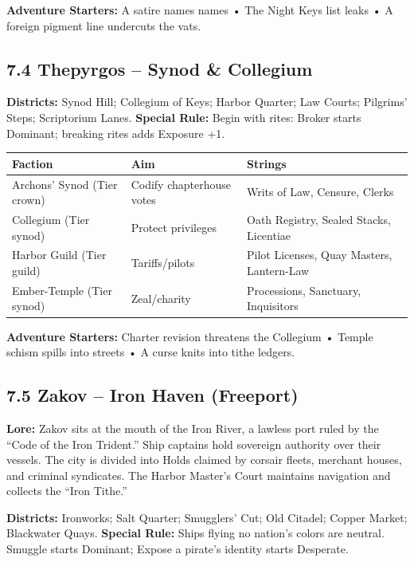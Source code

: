 \documentclass[11pt]{article}
\begin{document}
\textbf{Adventure Starters:} A satire names names • The Night Keys list leaks • A foreign pigment line undercuts the vats.

\subsection*{7.4 Thepyrgos -- Synod \& Collegium}
\textbf{Districts:} Synod Hill; Collegium of Keys; Harbor Quarter; Law Courts; Pilgrims' Steps; Scriptorium Lanes.  
\textbf{Special Rule:} Begin with rites: Broker starts Dominant; breaking rites adds Exposure +1.

\begin{tabular}{@{}p{3cm}p{3.5cm}p{3.5cm}@{}}
\toprule
Faction & Aim & Strings \\
\midrule
Archons' Synod (Tier crown) & Codify chapterhouse votes & Writs of Law, Censure, Clerks \\
Collegium (Tier synod) & Protect privileges & Oath Registry, Sealed Stacks, Licentiae \\
Harbor Guild (Tier guild) & Tariffs/pilots & Pilot Licenses, Quay Masters, Lantern-Law \\
Ember-Temple (Tier synod) & Zeal/charity & Processions, Sanctuary, Inquisitors \\
\bottomrule
\end{tabular}

\textbf{Adventure Starters:} Charter revision threatens the Collegium • Temple schism spills into streets • A curse knits into tithe ledgers.

\subsection*{7.5 Zakov -- Iron Haven (Freeport)}
\textbf{Lore:} Zakov sits at the mouth of the Iron River, a lawless port ruled by the ``Code of the Iron Trident.'' Ship captains hold sovereign authority over their vessels. The city is divided into Holds claimed by corsair fleets, merchant houses, and criminal syndicates. The Harbor Master's Court maintains navigation and collects the ``Iron Tithe.''  

\textbf{Districts:} Ironworks; Salt Quarter; Smugglers' Cut; Old Citadel; Copper Market; Blackwater Quays.  
\textbf{Special Rule:} Ships flying no nation's colors are neutral. Smuggle starts Dominant; Expose a pirate's identity starts Desperate.
\end{document}

